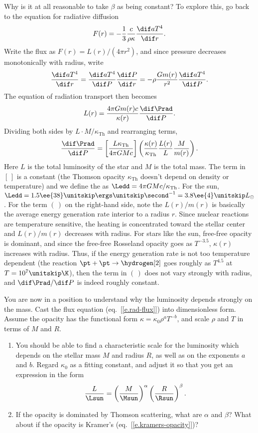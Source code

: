 Why is it at all reasonable to take $\beta$ as being constant? To explore this, go back to the equation for radiative diffusion
\[ F(r) = -\frac{1}{3}\frac{c}{\rho\kappa}\frac{\dif aT^{4}}{\dif r}. \]
Write the flux as $F(r) = L(r)/(4\pi r^{2})$, and since pressure decreases monotonically with radius, write
\[ 
\frac{\dif aT^{4}}{\dif r} = \frac{\dif aT^{4}}{\dif P}\frac{\dif P}{\dif r} = -\rho\frac{Gm(r)}{r^{2}}\frac{\dif aT^{4}}{\dif P}. 
\]
The equation of radiation transport then becomes
\[ L(r) = \frac{4\pi Gm(r) c}{\kappa(r)} \frac{\dif \Prad}{\dif P}. \]
Dividing both sides by $L\cdot M/\kappa_{\mathrm{Th}}$ and rearranging terms,
\begin{equation}\label{e.Prad-P}
 \frac{\dif \Prad}{\dif P} = \left[\frac{L\kappa_{\mathrm{Th}}}{4\pi GMc}\right]\left(\frac{\kappa(r)}{\kappa_{\mathrm{Th}}}\frac{L(r)}{L}\frac{M}{m(r)}\right).
\end{equation}
Here $L$ is the total luminosity of the star and $M$ is the total mass.  The term in $[\,]$ is a constant (the Thomson opacity $\kappa_{\mathrm{Th}}$ doesn't depend on density or temperature) and we define the  as $\Ledd=4\pi GM c/\kappa_{\mathrm{Th}}$.  For the sun, $\Ledd = 1.5\ee{38}\nsp\ergs\usp\second^{-1} = 3.8\ee{4}\nsp L_{\sun}$.  For the term $(\,)$ on the right-hand side, note the $L(r)/m(r)$ is basically the average energy generation rate interior to a radius $r$.  Since nuclear reactions are temperature sensitive, the heating is concentrated toward the stellar center and $L(r)/m(r)$ decreases with radius. For stars like the sun, free-free opacity is dominant, and since the free-free Rosseland opacity goes as $T^{-3.5}$, $\kappa(r)$ increases with radius.  Thus, if the energy generation rate is not too temperature dependent (the reaction $\pt + \pt \to \hydrogen[2]$ goes roughly as $T^{4.5}$ at $T=10^{7}\nsp\K$), then the term in $(\,)$  does not vary strongly with radius, and $\dif \Prad/\dif P$ is indeed roughly constant. 


\begin{exercisebox}
You are now in a position to understand why the luminosity depends strongly on the mass. Cast the flux equation (eq.~[\ref{e.rad-flux}]) into dimensionless form.  Assume the opacity has the functional form $\kappa = \kappa_{0} \rho^{a} T^{-b}$, and scale $\rho$ and $T$ in terms of $M$ and $R$. 

\begin{enumerate}
\item You should be able to find a characteristic scale for the luminosity which depends on the stellar mass $M$ and radius $R$, as well as on the exponents $a$ and $b$. Regard $\kappa_{0}$ as a fitting constant, and adjust it so that you get an expression in the form
\[
	\frac{L}{\Lsun} = \left(\frac{M}{\Msun}\right)^{\alpha} \left(\frac{R}{\Rsun}\right)^{\beta}.
\]

\item If the opacity is dominated by Thomson scattering, what are $\alpha$ and $\beta$?  What about if the opacity is Kramer's (eq.~[\ref{e.kramers-opacity}])?
\end{enumerate}
\end{exercisebox}



